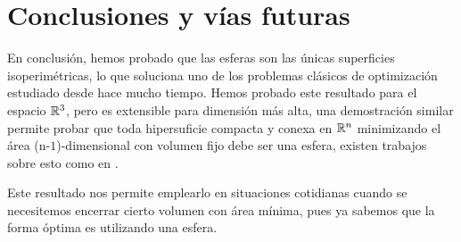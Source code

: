 \section{Conclusiones y vías futuras}

En conclusión, hemos probado que las esferas son las únicas superficies isoperimétricas, lo que soluciona uno de los problemas clásicos de optimización estudiado desde hace mucho tiempo. Hemos probado este resultado para el espacio $\mathbb{R}^3$, pero es extensible para dimensión más alta, una demostración similar permite probar que toda hipersuficie compacta y conexa en $\mathbb{R}^n$ minimizando el área (n-$1$)-dimensional con volumen fijo debe ser una esfera, existen trabajos sobre esto como en \cite{paperchicago}.

Este resultado nos permite emplearlo en situaciones cotidianas cuando se necesitemos encerrar cierto volumen con área mínima, pues ya sabemos que la forma óptima es utilizando una esfera.